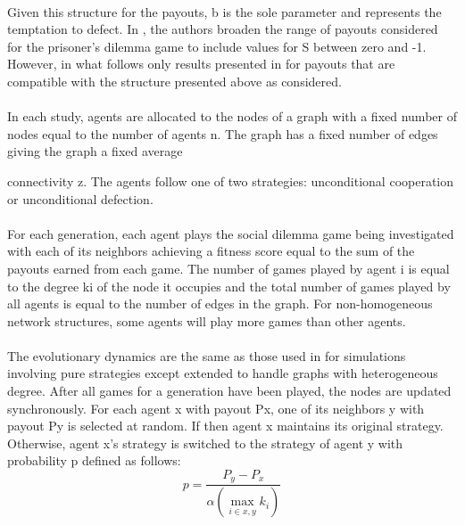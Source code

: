 \documentclass{article}
\begin{document}
    \paragraph{}Given this structure for the payouts, b is the sole parameter and represents the temptation to defect.  In \cite{Santos2006c}, the authors broaden the range of payouts considered for the prisoner's dilemma game to include values for S between zero and -1.  However, in what follows only results presented in \cite{Santos2006c} for payouts that are compatible with the structure presented above as considered.
    \paragraph{}In each study, agents are allocated to the nodes of a graph with a fixed number of nodes equal to the number of agents n.  The graph has a fixed number of edges giving the graph a fixed average

	\pagebreak[4]
    connectivity z.  The agents follow one of two strategies: unconditional cooperation or unconditional defection.
    \paragraph{}For each generation, each agent plays the social dilemma game being investigated with each of its neighbors achieving a fitness score equal to the sum of the payouts earned from each game.  The number of games played by agent i is equal to the degree ki of the node it occupies and the total number of games played by all agents is equal to the number of edges in the graph.  For non-homogeneous network structures, some agents will play more games than other agents.
    \paragraph{}The evolutionary dynamics are the same as those used in \cite{Hauert2004} for simulations involving pure strategies except extended to handle graphs with heterogeneous degree.  After all games for a generation have been played, the nodes are updated synchronously.  For each agent x with payout Px, one of its neighbors y with payout Py is selected at random.  If  then agent x maintains its original strategy.  Otherwise, agent x's strategy is switched to the strategy of agent y with probability p defined as follows:
    \begin{equation}
    	p=\frac{P_y-P_x}{\alpha\left(\max_{i\in{x,y}}k_i\right)}
    \end{equation}
\end{document}
